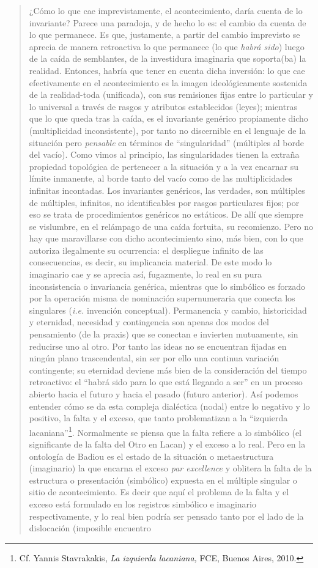\begin{quote}
¿Cómo lo que cae imprevistamente, el acontecimiento, daría cuenta de lo invariante? Parece una paradoja, y de hecho lo es: el cambio da cuenta de lo que permanece. Es que, justamente, a partir del cambio imprevisto se aprecia de manera retroactiva lo que permanece (lo que \emph{habrá sido}) luego de la caída de semblantes, de la investidura imaginaria que soporta(ba) la realidad. Entonces, habría que tener en cuenta dicha inversión: lo que cae efectivamente en el acontecimiento es la imagen ideológicamente sostenida de la realidad-toda (unificada), con sus remisiones fijas entre lo particular y lo universal a través de rasgos y atributos establecidos (leyes); mientras que lo que queda  tras la caída, es el invariante genérico propiamente dicho (multiplicidad inconsistente), por tanto no discernible en el lenguaje de la situación pero \emph{pensable} en términos de \enquote{singularidad} (múltiples al borde del vacío). Como vimos al principio, las singularidades tienen la extraña propiedad topológica de pertenecer a la situación y a la vez encarnar su límite inmanente, al borde tanto del vacío como de las multiplicidades infinitas incontadas. Los invariantes genéricos, las verdades, son múltiples de múltiples, infinitos, no identificables por rasgos particulares fijos; por eso se trata de procedimientos genéricos no estáticos. De allí que siempre se vislumbre, en el relámpago de una caída fortuita, su recomienzo. Pero no hay que maravillarse con dicho acontecimiento sino, más bien, con lo que autoriza ilegalmente su ocurrencia: el despliegue infinito de las consecuencias, es decir, su implicancia material. De este modo lo imaginario cae y se aprecia así, fugazmente, lo real en su pura inconsistencia o invariancia genérica, mientras que lo simbólico es forzado por la operación misma de nominación supernumeraria que conecta los singulares (\emph{i.e.} invención conceptual). Permanencia y cambio, historicidad y eternidad, necesidad y contingencia son apenas dos modos del pensamiento (de la praxis) que se conectan e invierten mutuamente, sin reducirse uno al otro. Por tanto las ideas no se encuentran fijadas en ningún plano trascendental, sin ser por ello una continua variación contingente; su eternidad deviene más bien de la consideración del tiempo retroactivo: el \enquote{habrá sido para lo que está llegando a ser} en un proceso abierto hacia el futuro y hacia el pasado (futuro anterior). Así podemos entender cómo se da esta compleja dialéctica (nodal) entre lo negativo y lo positivo, la falta y el exceso, que tanto problematizan a la \enquote{izquierda lacaniana}\footnote{Cf. Yannis Stavrakakis, \emph{La izquierda lacaniana,} FCE, Buenos Aires, 2010.}. Normalmente se piensa que la falta refiere a lo simbólico (el significante de la falta del Otro en Lacan) y el exceso a lo real. Pero en la ontología de Badiou es el estado de la situación o metaestructura (imaginario) la que encarna el exceso \emph{par excellence} y oblitera la falta de la estructura o presentación (simbólico) expuesta en el múltiple singular o sitio de acontecimiento. Es decir que aquí el problema de la falta y el exceso está formulado en los registros simbólico e imaginario respectivamente, y lo real bien podría ser pensado tanto por el lado de la dislocación (imposible encuentro 
\end{quote}
